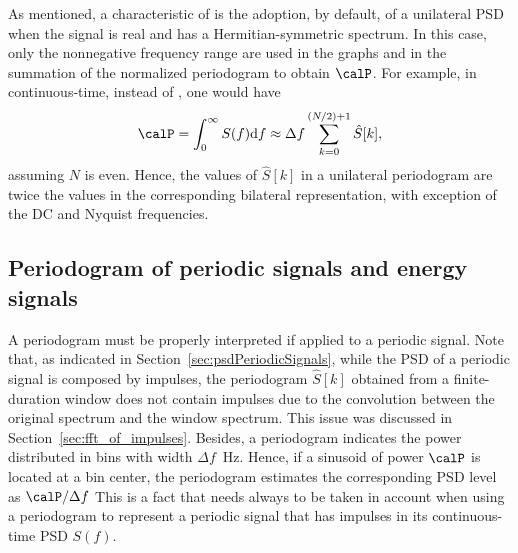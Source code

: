 

As mentioned, a characteristic of {\matlab} is the adoption, by default, of a unilateral PSD when the signal is real and has a Hermitian-symmetric spectrum. In this case, only the nonnegative frequency range are used in the graphs and in the summation of the normalized periodogram to obtain $\calP$. For example, in continuous-time, instead of , one would have
\begin{equation}
\calP = \int_{0}^\infty S(f) \textrm{d}f \approx \Delta f \sum_{k=0}^{(N/2)+1} \hat S[k],
\label{eq:unilateralPowerForContinuosTime}
\end{equation}
assuming $N$ is even. Hence, the values of $\hat S[k]$ in a unilateral periodogram are twice the values in the corresponding bilateral representation, with exception of the DC and Nyquist frequencies.

\subsection{Periodogram of periodic signals and energy signals}
\label{sec:periodogram_periodic_energy_signals}
A periodogram must be properly interpreted if applied to a periodic signal.
Note that, as indicated in Section~\ref{sec:psdPeriodicSignals}, while the PSD of a periodic signal is composed by impulses,  the periodogram $\hat S[k]$ obtained from a finite-duration window does not contain impulses due to the convolution between the
original spectrum and the window spectrum.
This issue was discussed in Section~\ref{sec:fft_of_impulses}.
Besides, a periodogram indicates the power distributed in bins with width $\Delta f$~Hz. 
Hence, if a sinusoid of power $\calP$ is located at a bin center, the periodogram estimates
the corresponding PSD level as $\calP / \Delta f$
This is a fact that needs always to be taken in account when using a periodogram to represent a periodic signal that
has impulses in its continuous-time PSD $S(f)$.

